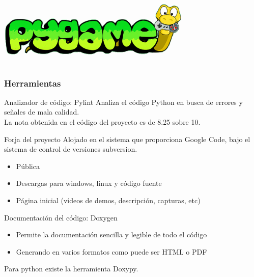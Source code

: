 \begin{frame}
\begin{columns}
        \column{100px}

        \begin{center}
                \includegraphics[scale=0.24]{imagenes/logo_pygame.png}
        \end{center}
        
    \end{columns}

\end{frame}

\begin{frame}
    \frametitle{Herramientas}

        \begin{block}{Analizador de código: Pylint}
        Analiza el código Python en busca de errores y señales de mala calidad.\\
        La nota obtenida en el código del proyecto es de 8.25 sobre 10.
        \end{block}

        \begin{block}{Forja del proyecto}
        Alojado en el sistema que proporciona Google Code, bajo el sistema de control de versiones subversion.
            \begin{itemize}
                \item Pública
                \item Descargas para windows, linux y código fuente
                \item Página inicial (vídeos de demos, descripción, capturas, etc)
            \end{itemize}
        \end{block}

        \begin{block}{Documentación del código: Doxygen}
            \begin{itemize}
                \item Permite la documentación sencilla y legible de todo el código
                \item Generando en varios formatos como puede ser HTML o PDF
            \end{itemize}
        Para python existe la herramienta Doxypy.
        \end{block}

\end{frame}

